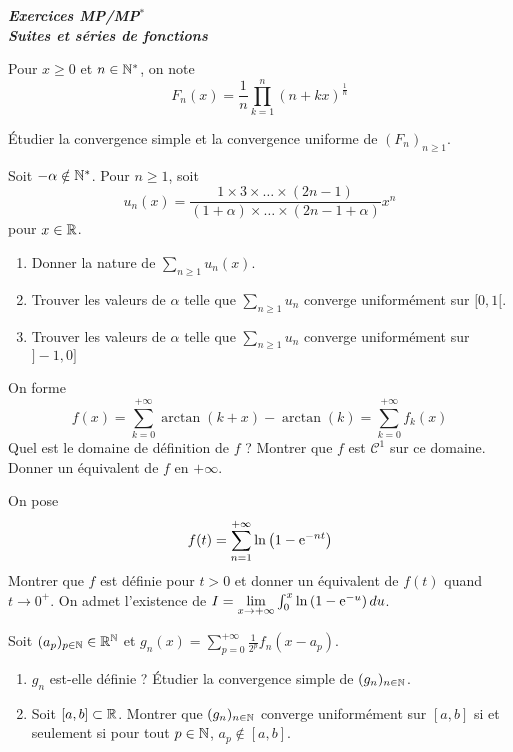 \documentclass[12pt]{article}
\begin{document}
\begin{titlepage}
	\centering
	\vspace*{\fill}
	\Huge \textit{\textbf{Exercices MP/MP$^*$\\ Suites et séries de fonctions}}
	\vspace*{\fill}
\end{titlepage}

\begin{exercise}
    Pour $x\geqslant0$ et $n\in\mathbb{N}^{*}$, on note 
    $$F_{n}(x)=\frac{1}{n}\prod_{k=1}^{n}\left(n+kx\right)^{\frac{1}{n}}$$

    Étudier la convergence simple et la convergence uniforme de $(F_{n})_{n\geqslant1}$.
\end{exercise}

\begin{exercise}
    Soit $-\alpha\notin\mathbb{N}^{*}$. Pour $n\geqslant1$, soit 
    $$u_{n}(x)=\frac{1\times 3\times\dots\times(2n-1)}{(1+\alpha)\times\dots\times(2n-1+\alpha)}x^{n}$$
    pour $x\in\mathbb{R}$.

    \begin{enumerate}
        \item Donner la nature de $\sum_{n\geqslant1}u_{n}(x)$.
        \item Trouver les valeurs de $\alpha$ telle que $\sum_{n\geqslant1}u_{n}$ converge uniformément sur $[0,1[$.
        \item Trouver les valeurs de $\alpha$ telle que $\sum_{n\geqslant1}u_{n}$ converge uniformément sur $]-1,0]$
    \end{enumerate}
\end{exercise}

\begin{exercise}
    On forme 
    $$f(x)=\sum_{k=0}^{+\infty}\arctan(k+x)-\arctan(k)=\sum_{k=0}^{+\infty}f_{k}(x)$$
    Quel est le domaine de définition de $f$ ? Montrer que $f$ est $\mathcal{C}^{1}$ sur ce domaine. Donner un équivalent de $f$ en $+\infty$.
\end{exercise}

\begin{exercise}
    On pose 
    $$f(t)=\sum_{n=1}^{+\infty}\ln\left(1-\mathrm{e}^{-nt}\right)$$
    Montrer que $f$ est définie pour $t>0$ et donner un équivalent de $f(t)$ quand $t\to0^{+}$. On admet l'existence de $I=\lim\limits_{x\to+\infty}\int_{0}^{x}\ln\left(1-\mathrm{e}^{-u}\right)du$.
\end{exercise}

\begin{exercise}
    Soit 
    $(a_{p})_{p\in\mathbb{N}}\in\mathbb{R}^{\mathbb{N}}$ et $g_{n}(x)=\sum_{p=0}^{+\infty}\frac{1}{2^{p}}f_{n}(x-a_{p})$.
    \begin{enumerate}
        \item $g_{n}$ est-elle définie ? Étudier la convergence simple de $(g_{n})_{n\in\mathbb{N}}$.
        \item Soit $[a,b]\subset\mathbb{R}$. Montrer que $(g_{n})_{n\in\mathbb{N}}$ converge uniformément sur $[a,b]$ si et seulement si pour tout $p\in\mathbb{N}$, $a_{p}\notin[a,b]$.
    \end{enumerate}
\end{exercise}
\end{document}
